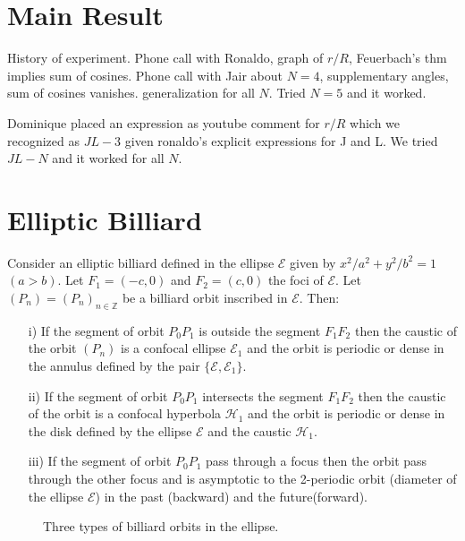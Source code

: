 \section{Main Result}

History of experiment. Phone call with Ronaldo, graph of $r/R$, Feuerbach's thm implies sum of cosines. Phone call with Jair about $N=4$, supplementary angles, sum of cosines vanishes. generalization for all $N$. Tried $N=5$ and it worked.

Dominique placed an expression as youtube comment for $r/R$ which we recognized as $J L - 3$ given ronaldo's explicit expressions for J and L. We tried $J L - N$ and it worked for all $N$.

\section{Elliptic Billiard}

 

 \begin{theorem} Consider an  elliptic billiard defined  in the ellipse $\mathcal{E}$ given by $x^2/a^2+y^2/b^2=1$ $(a>b)$. Let $F_1=(-c,0)$ and $F_2=(c,0) $ the foci of $\mathcal{E}$. Let $(P_n)=(P_n)_{n\in\mathbb{Z}}$ be a billiard orbit inscribed in $\mathcal{E}$. Then:
 
 \begin{itemize} 
 \item[i)] If the segment of orbit $P_0P_1$ is outside the segment $F_1F_2$ then the caustic of the orbit $(P_n)$ is a confocal ellipse $\mathcal{E}_1$ and the orbit is periodic or dense in the annulus defined by the pair  $\{\mathcal{E},   \mathcal{E}_1 \}$.
 
  \item[ii)] If the segment of orbit $P_0P_1$   intersects the segment $F_1F_2$ then the caustic of the orbit is a confocal hyperbola  $\mathcal{H}_1$ and the orbit is periodic or dense in the disk defined by the ellipse $\mathcal{E}$ and the caustic $\mathcal{H}_1$.
  
   \item[iii)] If the segment of orbit $P_0P_1$ pass through a focus  then the orbit pass through the other focus and is asymptotic to the 2-periodic orbit (diameter of the ellipse $\mathcal{E}$) in the past (backward) and  the future(forward).
\end{itemize}
 \begin{figure}[H]
	\begin{center}
		\def\svgwidth{1.0\textwidth}
		
		\caption { Three types of billiard orbits in the ellipse.   \label{fig:caustic1}}
	\end{center}
\end{figure}
 \end{theorem}
 
